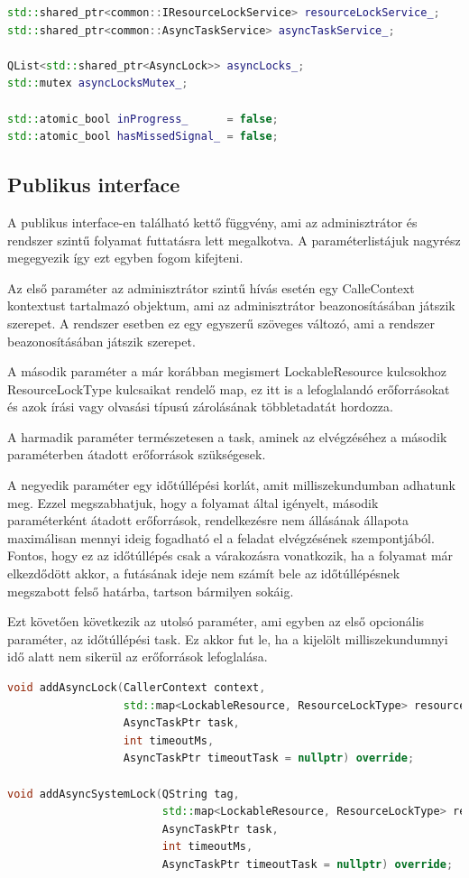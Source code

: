 \begin{lstlisting}[language={C++}]
std::shared_ptr<common::IResourceLockService> resourceLockService_;
std::shared_ptr<common::AsyncTaskService> asyncTaskService_;

QList<std::shared_ptr<AsyncLock>> asyncLocks_;
std::mutex asyncLocksMutex_;

std::atomic_bool inProgress_      = false;
std::atomic_bool hasMissedSignal_ = false;
\end{lstlisting}

\subsection{Publikus interface}

A publikus interface-en található kettő függvény, ami az adminisztrátor és rendszer szintű folyamat futtatásra lett megalkotva. A paraméterlistájuk nagyrész megegyezik így ezt egyben fogom kifejteni.

Az első paraméter az adminisztrátor szintű hívás esetén egy CalleContext kontextust tartalmazó objektum, ami az adminisztrátor beazonosításában játszik szerepet. A rendszer esetben ez egy egyszerű szöveges változó, ami a rendszer beazonosításában játszik szerepet.

A második paraméter a már korábban megismert LockableResource kulcsokhoz ResourceLockType kulcsaikat rendelő map, ez itt is a lefoglalandó erőforrásokat és azok írási vagy olvasási típusú zárolásának többletadatát hordozza.

A harmadik paraméter természetesen a task, aminek az elvégzéséhez a második paraméterben átadott erőforrások szükségesek. 

A negyedik paraméter egy időtúllépési korlát, amit milliszekundumban adhatunk meg. Ezzel megszabhatjuk, hogy a folyamat által igényelt, második paraméterként átadott erőforrások, rendelkezésre nem állásának állapota maximálisan mennyi ideig fogadható el a feladat elvégzésének szempontjából. Fontos, hogy ez az időtúllépés csak a várakozásra vonatkozik, ha a folyamat már elkezdődött akkor, a futásának ideje nem számít bele az időtúllépésnek megszabott felső határba, tartson bármilyen sokáig.

Ezt követően következik az utolsó paraméter, ami egyben az első opcionális paraméter, az időtúllépési task. Ez akkor fut le, ha a kijelölt milliszekundumnyi idő alatt nem sikerül az erőforrások lefoglalása.

\begin{lstlisting}[language={C++}]
void addAsyncLock(CallerContext context,
                  std::map<LockableResource, ResourceLockType> resources,
                  AsyncTaskPtr task,
                  int timeoutMs,
                  AsyncTaskPtr timeoutTask = nullptr) override;

void addAsyncSystemLock(QString tag,
                        std::map<LockableResource, ResourceLockType> resources,
                        AsyncTaskPtr task,
                        int timeoutMs,
                        AsyncTaskPtr timeoutTask = nullptr) override;
\end{lstlisting}

